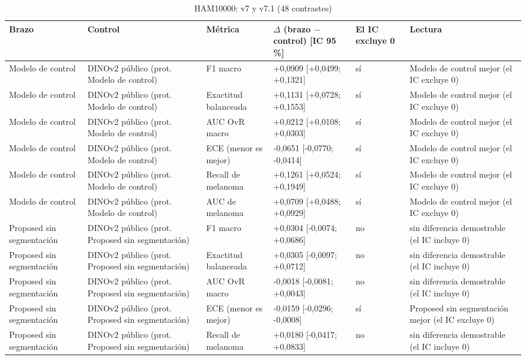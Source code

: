 \begingroup\scriptsize
\begin{longtable}{@{}llllll@{}}
\caption{HAM10000: v7 y v7.1 (48 contrastes)}\label{tab:contrast-v71} \\
\toprule
Brazo & Control & Métrica & $\Delta$ (brazo $-$ control) [IC 95 \%] & El IC excluye 0 & Lectura \\
\midrule
Modelo de control & DINOv2 público (prot. Modelo de control) & F1 macro & +0,0909 [+0,0499; +0,1321] & sí & Modelo de control mejor (el IC excluye 0) \\
Modelo de control & DINOv2 público (prot. Modelo de control) & Exactitud balanceada & +0,1131 [+0,0728; +0,1553] & sí & Modelo de control mejor (el IC excluye 0) \\
Modelo de control & DINOv2 público (prot. Modelo de control) & AUC OvR macro & +0,0212 [+0,0108; +0,0303] & sí & Modelo de control mejor (el IC excluye 0) \\
Modelo de control & DINOv2 público (prot. Modelo de control) & ECE (menor es mejor) & -0,0651 [-0,0770; -0,0414] & sí & Modelo de control mejor (el IC excluye 0) \\
Modelo de control & DINOv2 público (prot. Modelo de control) & Recall de melanoma & +0,1261 [+0,0524; +0,1949] & sí & Modelo de control mejor (el IC excluye 0) \\
Modelo de control & DINOv2 público (prot. Modelo de control) & AUC de melanoma & +0,0709 [+0,0488; +0,0929] & sí & Modelo de control mejor (el IC excluye 0) \\
Proposed sin segmentación & DINOv2 público (prot. Proposed sin segmentación) & F1 macro & +0,0304 [-0,0074; +0,0686] & no & sin diferencia demostrable (el IC incluye 0) \\
Proposed sin segmentación & DINOv2 público (prot. Proposed sin segmentación) & Exactitud balanceada & +0,0305 [-0,0097; +0,0712] & no & sin diferencia demostrable (el IC incluye 0) \\
Proposed sin segmentación & DINOv2 público (prot. Proposed sin segmentación) & AUC OvR macro & -0,0018 [-0,0081; +0,0043] & no & sin diferencia demostrable (el IC incluye 0) \\
Proposed sin segmentación & DINOv2 público (prot. Proposed sin segmentación) & ECE (menor es mejor) & -0,0159 [-0,0296; -0,0008] & sí & Proposed sin segmentación mejor (el IC excluye 0) \\
Proposed sin segmentación & DINOv2 público (prot. Proposed sin segmentación) & Recall de melanoma & +0,0180 [-0,0417; +0,0833] & no & sin diferencia demostrable (el IC incluye 0) \\

\end{longtable}
